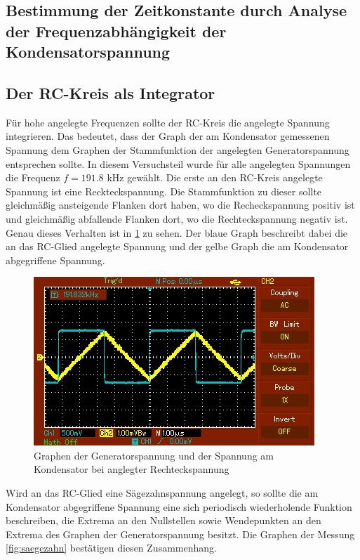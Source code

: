\subsection{Bestimmung der Zeitkonstante durch Analyse der Frequenzabhängigkeit der Kondensatorspannung}

\subsection{Der RC-Kreis als Integrator}

Für hohe angelegte Frequenzen sollte der RC-Kreis die angelegte Spannung integrieren.
Das bedeutet, dass der Graph der am Kondensator gemessenen Spannung dem Graphen der
Stammfunktion der angelegten Generatorspannung entsprechen sollte. In diesem Versuchsteil
wurde für alle angelegten Spannungen die Frequenz $f=191.8$ kHz gewählt.
Die erste an den RC-Kreis angelegte Spannung ist eine Reckteckspannung. Die Stammfunktion
zu dieser sollte gleichmäßig ansteigende Flanken dort haben, wo die Recheckspannung
positiv ist und gleichmäßig abfallende Flanken dort, wo die Rechteckspannung
negativ ist. Genau dieses Verhalten ist in \ref{fig:rechteck} zu sehen. Der blaue Graph beschreibt
dabei die an das RC-Glied angelegte Spannung und der gelbe Graph die am Kondensator
abgegriffene Spannung.
\begin{figure}
  \centering
  \includegraphics{data/integration_rechteck.PNG}
  \caption{Graphen der Generatorspannung und der Spannung am Kondensator bei anglegter
  Rechteckspannung}
  \label{fig:rechteck}
\end{figure}
Wird an das RC-Glied eine Sägezahnspannung angelegt, so sollte die am Kondensator
abgegriffene Spannung eine sich periodisch wiederholende Funktion beschreiben, die
Extrema an den Nullstellen sowie Wendepunkten an den Extrema des Graphen der
Generatorspannung besitzt. Die Graphen der Messung \ref{fig:saegezahn} bestätigen diesen Zusammenhang.
